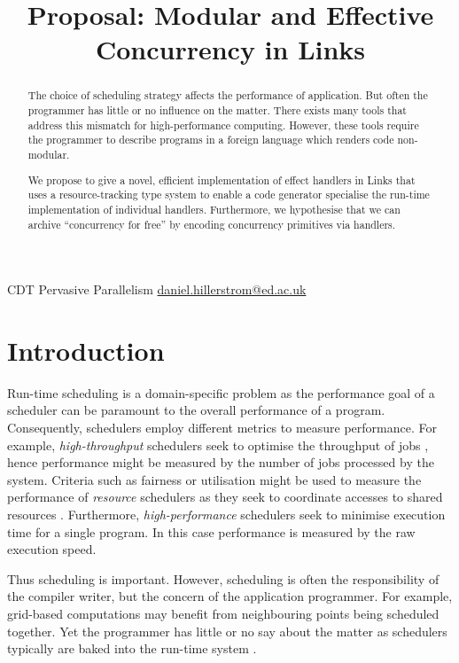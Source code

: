 \documentclass[preprint,10pt,numbers]{sigplanconf}
\begin{document}
\title{Proposal: Modular and Effective Concurrency in Links}

           {CDT Pervasive Parallelism}
           {\href{mailto:daniel.hillerstrom@ed.ac.uk}{daniel.hillerstrom@ed.ac.uk}}
  \maketitle
  \begin{abstract}
The choice of scheduling strategy affects the performance of application. But often the programmer has little or no influence on the matter. There exists many tools that address this mismatch for high-performance computing. However, these tools require the programmer to describe programs in a foreign language which renders code non-modular.

We propose to give a novel, efficient implementation of effect handlers in Links that uses a resource-tracking type system to enable a code generator specialise the run-time implementation of individual handlers. Furthermore, we hypothesise that we can archive ``concurrency for free'' by encoding concurrency primitives via handlers.
  \end{abstract}
  \section{Introduction}
Run-time scheduling is a domain-specific problem as the performance goal of a scheduler can be paramount to the overall performance of a program. Consequently, schedulers employ different metrics to measure performance. For example, \emph{high-throughput} schedulers seek to optimise the throughput of jobs \cite{Berman2003}, hence performance might be measured by the number of jobs processed by the system. Criteria such as fairness or utilisation might be used to measure the performance of \emph{resource} schedulers as they seek to coordinate accesses to shared resources \cite{Berman2003}. Furthermore, \emph{high-performance} schedulers seek to minimise execution time for a single program. In this case performance is measured by the raw execution speed.

Thus scheduling is important. However, scheduling is often the responsibility of the compiler writer, but the concern of the application programmer. For example, grid-based computations may benefit from neighbouring points being scheduled together. Yet the programmer has little or no say about the matter as schedulers typically are baked into the run-time system \cite{Dolan2015}. 
\end{document}
